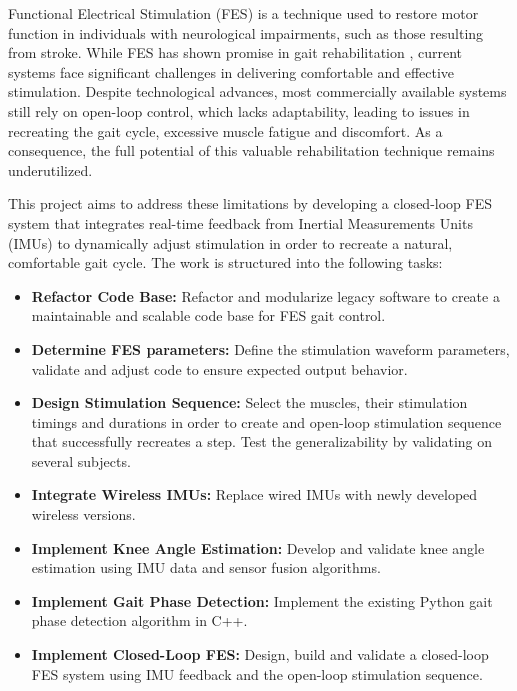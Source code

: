 
Functional Electrical Stimulation (FES) is a technique used to restore motor function in individuals with neurological impairments, such as those resulting from stroke. While FES has shown promise in gait rehabilitation , current systems face significant challenges in delivering comfortable and effective stimulation. Despite technological advances, most commercially available systems still rely on open-loop control, which lacks adaptability, leading to issues in recreating the gait cycle, excessive muscle fatigue and discomfort. As a consequence, the full potential of this valuable rehabilitation technique remains underutilized.

This project aims to address these limitations by developing a closed-loop FES system that integrates real-time feedback from Inertial Measurements Units (IMUs) to dynamically adjust stimulation in order to recreate a natural, comfortable gait cycle. The work is structured into the following tasks:
\begin{itemize}
    \item \textbf{Refactor Code Base:} Refactor and modularize legacy software to create a maintainable and scalable code base for FES gait control.
    \item \textbf{Determine FES parameters:} Define the stimulation waveform parameters, validate and adjust code to ensure expected output behavior.
    \item \textbf{Design Stimulation Sequence:} Select the muscles, their stimulation timings and durations in order to create and open-loop stimulation sequence that successfully recreates a step. Test the generalizability by validating on several subjects.
    \item \textbf{Integrate Wireless IMUs:} Replace wired IMUs with newly developed wireless versions.
    \item \textbf{Implement Knee Angle Estimation:} Develop and validate knee angle estimation using IMU data and sensor fusion algorithms.
    \item \textbf{Implement Gait Phase Detection:} Implement the existing Python gait phase detection algorithm in C++.
    \item \textbf{Implement Closed-Loop FES:} Design, build and validate a closed-loop FES system using IMU feedback and the open-loop stimulation sequence.
\end{itemize}


